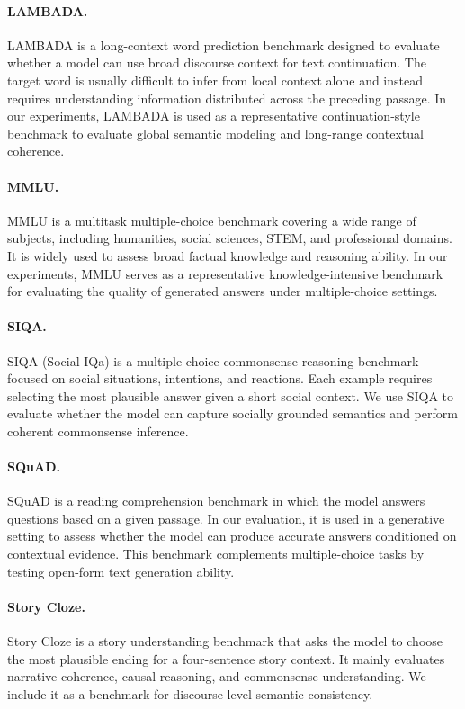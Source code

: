 \paragraph{LAMBADA.}
LAMBADA \citep{paperno2016lambada} is a long-context word prediction benchmark designed to evaluate whether a model can use broad discourse context for text continuation. The target word is usually difficult to infer from local context alone and instead requires understanding information distributed across the preceding passage. In our experiments, LAMBADA is used as a representative continuation-style benchmark to evaluate global semantic modeling and long-range contextual coherence.

\paragraph{MMLU.}
MMLU \citep{hendrycks2020measuring} is a multitask multiple-choice benchmark covering a wide range of subjects, including humanities, social sciences, STEM, and professional domains. It is widely used to assess broad factual knowledge and reasoning ability. In our experiments, MMLU serves as a representative knowledge-intensive benchmark for evaluating the quality of generated answers under multiple-choice settings.

\paragraph{SIQA.}
SIQA \citep{sap2019social} (Social IQa) is a multiple-choice commonsense reasoning benchmark focused on social situations, intentions, and reactions. Each example requires selecting the most plausible answer given a short social context. We use SIQA to evaluate whether the model can capture socially grounded semantics and perform coherent commonsense inference.

\paragraph{SQuAD.}
SQuAD \citep{rajpurkar2016squad} is a reading comprehension benchmark in which the model answers questions based on a given passage. In our evaluation, it is used in a generative setting to assess whether the model can produce accurate answers conditioned on contextual evidence. This benchmark complements multiple-choice tasks by testing open-form text generation ability.

\paragraph{Story Cloze.}
Story Cloze \citep{mostafazadeh2016corpus} is a story understanding benchmark that asks the model to choose the most plausible ending for a four-sentence story context. It mainly evaluates narrative coherence, causal reasoning, and commonsense understanding. We include it as a benchmark for discourse-level semantic consistency.

